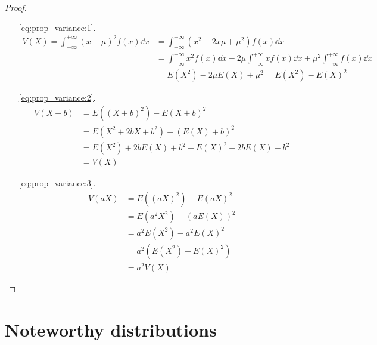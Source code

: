 \documentclass[12pt]{extarticle}
\begin{document}
\begin{proof}
    \skiplineafterproof
    \begin{enumerate}
        \item[\ref{eq:prop_variance:1}.]
            \begin{align}
                V(X) = \int_{-\infty}^{+\infty} (x - \mu)^2 f(x) \dd{x} & = \int_{-\infty}^{+\infty} (x^2 - 2x\mu + \mu^2) f(x) \dd{x}                                                                          \\
                                                                        & = \int_{-\infty}^{+\infty} x^2 f(x) \dd{x} - 2\mu \int_{-\infty}^{+\infty} x f(x) \dd{x} + \mu^2 \int_{-\infty}^{+\infty} f(x) \dd{x} \\
                                                                        & = E(X^2) - 2\mu E(X) + \mu^2 = E(X^2) - E(X)^2
            \end{align}

        \item[\ref{eq:prop_variance:2}.] \begin{align}
                V(X + b) & = E((X + b)^2) - E(X + b)^2                     \\
                         & = E(X^2 + 2bX + b^2) - (E(X) + b)^2             \\
                         & = E(X^2) + 2bE(X) + b^2 - E(X)^2 - 2bE(X) - b^2 \\
                         & = V(X)
            \end{align}

        \item[\ref{eq:prop_variance:3}.] \begin{align}
                V(aX) & = E((aX)^2) - E(aX)^2     \\
                      & = E(a^2 X^2) - (aE(X))^2  \\
                      & = a^2 E(X^2) - a^2 E(X)^2 \\
                      & = a^2 (E(X^2) - E(X)^2)   \\
                      & = a^2 V(X)
            \end{align}
    \end{enumerate}
\end{proof}


\section{Noteworthy distributions}
\end{document}
